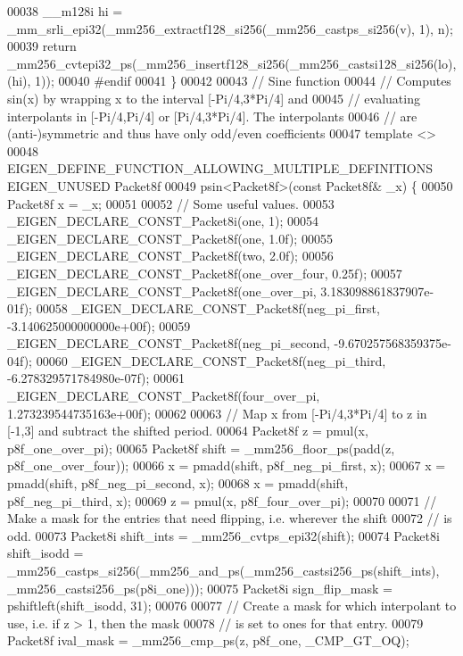 \begin{DoxyCode}
00038   \_\_m128i hi = \_mm\_srli\_epi32(\_mm256\_extractf128\_si256(\_mm256\_castps\_si256(v), 1), n);
00039   \textcolor{keywordflow}{return} \_mm256\_cvtepi32\_ps(\_mm256\_insertf128\_si256(\_mm256\_castsi128\_si256(lo), (hi), 1));
00040 \textcolor{preprocessor}{#endif}
00041 \}
00042 
00043 \textcolor{comment}{// Sine function}
00044 \textcolor{comment}{// Computes sin(x) by wrapping x to the interval [-Pi/4,3*Pi/4] and}
00045 \textcolor{comment}{// evaluating interpolants in [-Pi/4,Pi/4] or [Pi/4,3*Pi/4]. The interpolants}
00046 \textcolor{comment}{// are (anti-)symmetric and thus have only odd/even coefficients}
00047 \textcolor{keyword}{template} <>
00048 EIGEN\_DEFINE\_FUNCTION\_ALLOWING\_MULTIPLE\_DEFINITIONS EIGEN\_UNUSED Packet8f
00049 psin<Packet8f>(\textcolor{keyword}{const} Packet8f& \_x) \{
00050   Packet8f x = \_x;
00051 
00052   \textcolor{comment}{// Some useful values.}
00053   \_EIGEN\_DECLARE\_CONST\_Packet8i(one, 1);
00054   \_EIGEN\_DECLARE\_CONST\_Packet8f(one, 1.0f);
00055   \_EIGEN\_DECLARE\_CONST\_Packet8f(two, 2.0f);
00056   \_EIGEN\_DECLARE\_CONST\_Packet8f(one\_over\_four, 0.25f);
00057   \_EIGEN\_DECLARE\_CONST\_Packet8f(one\_over\_pi, 3.183098861837907e-01f);
00058   \_EIGEN\_DECLARE\_CONST\_Packet8f(neg\_pi\_first, -3.140625000000000e+00f);
00059   \_EIGEN\_DECLARE\_CONST\_Packet8f(neg\_pi\_second, -9.670257568359375e-04f);
00060   \_EIGEN\_DECLARE\_CONST\_Packet8f(neg\_pi\_third, -6.278329571784980e-07f);
00061   \_EIGEN\_DECLARE\_CONST\_Packet8f(four\_over\_pi, 1.273239544735163e+00f);
00062 
00063   \textcolor{comment}{// Map x from [-Pi/4,3*Pi/4] to z in [-1,3] and subtract the shifted period.}
00064   Packet8f z = pmul(x, p8f\_one\_over\_pi);
00065   Packet8f shift = \_mm256\_floor\_ps(padd(z, p8f\_one\_over\_four));
00066   x = pmadd(shift, p8f\_neg\_pi\_first, x);
00067   x = pmadd(shift, p8f\_neg\_pi\_second, x);
00068   x = pmadd(shift, p8f\_neg\_pi\_third, x);
00069   z = pmul(x, p8f\_four\_over\_pi);
00070 
00071   \textcolor{comment}{// Make a mask for the entries that need flipping, i.e. wherever the shift}
00072   \textcolor{comment}{// is odd.}
00073   Packet8i shift\_ints = \_mm256\_cvtps\_epi32(shift);
00074   Packet8i shift\_isodd = \_mm256\_castps\_si256(\_mm256\_and\_ps(\_mm256\_castsi256\_ps(shift\_ints), 
      \_mm256\_castsi256\_ps(p8i\_one)));
00075   Packet8i sign\_flip\_mask = pshiftleft(shift\_isodd, 31);
00076 
00077   \textcolor{comment}{// Create a mask for which interpolant to use, i.e. if z > 1, then the mask}
00078   \textcolor{comment}{// is set to ones for that entry.}
00079   Packet8f ival\_mask = \_mm256\_cmp\_ps(z, p8f\_one, \_CMP\_GT\_OQ);

\end{DoxyCode}
